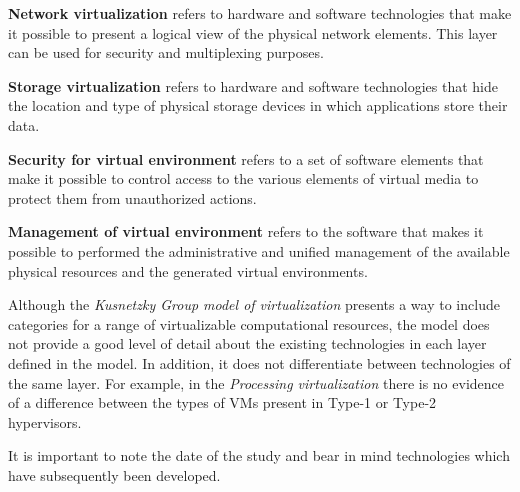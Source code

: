 	\textbf{Network virtualization} refers to hardware and software technologies that make it possible to present a logical view of the physical network elements. This layer can be used for security and multiplexing purposes.
		
	\textbf{Storage virtualization} refers to hardware and software technologies that hide the location and type of physical storage devices in which applications store their data.
		
	\textbf{Security for virtual environment} refers to a set of software elements that make it possible to control access to the various elements of virtual media to protect them from unauthorized actions.
		
	\textbf{Management of virtual environment} refers to the software that makes it possible to performed the administrative and unified management of the available physical resources and the generated virtual environments.

	Although the \textit{Kusnetzky Group model of virtualization} presents a way to include categories for a range of virtualizable computational resources, the model does not provide a good level of detail about the existing technologies in each layer defined in the model. In addition, it does not differentiate between technologies of the same layer. For example, in the \textit{Processing virtualization} there is no evidence of a difference between the types of VMs present in Type-1 or Type-2 hypervisors. 
	
	It is important to note the date of the study and bear in mind technologies which have subsequently been developed. 
